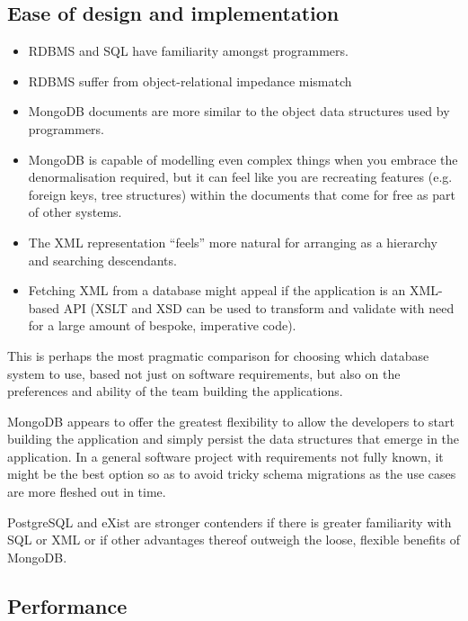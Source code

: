 \documentclass[11pt,a4paper]{article}
\begin{document}
\subsection{Ease of design and implementation}

\begin{itemize}
  \item RDBMS and SQL have familiarity amongst programmers.
  \item RDBMS suffer from object-relational impedance mismatch
  \item MongoDB documents are more similar to the object data
    structures used by programmers.
  \item MongoDB is capable of modelling even complex things
    when you embrace the denormalisation required, but it can
    feel like you are recreating features (e.g. foreign keys,
    tree structures) within the documents that come for free as
    part of other systems.
  \item The XML representation ``feels'' more natural for arranging
    as a hierarchy and searching descendants.
  \item Fetching XML from a database might appeal if the application
    is an XML-based API (XSLT and XSD can be used to transform
    and validate with need for a large amount of bespoke, imperative
    code).
\end{itemize}

This is perhaps the most pragmatic comparison for choosing which
database system to use, based not just on software requirements, but
also on the preferences and ability of the team building the applications.

MongoDB appears to offer the greatest flexibility to allow the developers
to start building the application and simply persist
the data structures that emerge in the application. In
a general software project with requirements not fully known, it might
be the best option so as to avoid tricky schema migrations as
the use cases are more fleshed out in time.

PostgreSQL and eXist are stronger contenders if there is greater
familiarity with SQL or XML or if other advantages thereof outweigh
the loose, flexible benefits of MongoDB.

\subsection{Performance}
\end{document}
